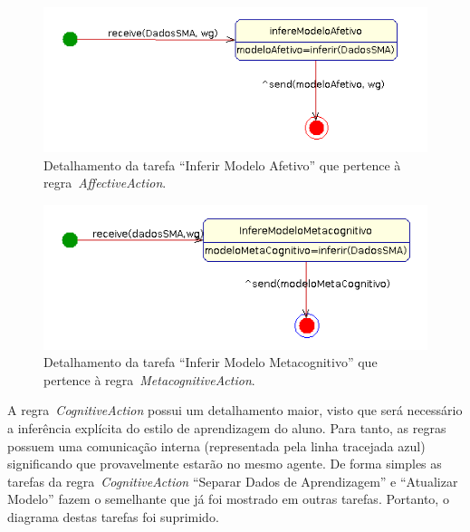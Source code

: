 \begin{figure}
	\centering
	\includegraphics[scale=0.48]{images/td-inferir-afetivo.png}
	\caption{Detalhamento da tarefa ``Inferir Modelo Afetivo'' que pertence à regra~\emph{AffectiveAction}.}
	\label{fig:td-inferir-afetivo}
\end{figure}

\begin{figure}
	\centering
	\includegraphics[scale=0.48]{images/td-inferir-metacognitivo.png}
	\caption{Detalhamento da tarefa ``Inferir Modelo Metacognitivo'' que pertence à regra~\emph{MetacognitiveAction}.}
	\label{fig:td-inferir-metacognitivo}
\end{figure}

A regra~\emph{CognitiveAction} possui um detalhamento maior, visto que será necessário a inferência explícita do estilo de aprendizagem do aluno. Para tanto, as regras possuem uma comunicação interna (representada pela linha tracejada azul) significando que provavelmente estarão no mesmo agente. De forma simples as tarefas da regra~\emph{CognitiveAction} ``Separar Dados de Aprendizagem'' e ``Atualizar Modelo'' fazem o semelhante que já foi mostrado em outras tarefas. Portanto, o diagrama destas tarefas foi suprimido.

